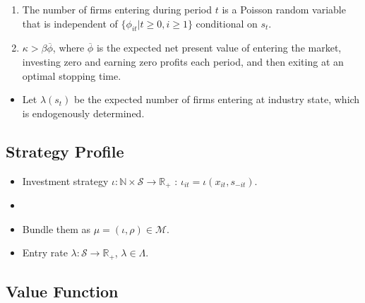 \documentclass[
]{book}
\providecommand{\tightlist}{%
  \setlength{\itemsep}{0pt}\setlength{\parskip}{0pt}}
\begin{document}
\begin{enumerate}
\def\labelenumi{\arabic{enumi}.}
\tightlist
\item
  The number of firms entering during period \(t\) is a Poisson random
  variable that is independent of \(\{\phi_{it}| t \ge 0, i \ge 1\}\)
  conditional on \(s_t\).
\item
  \(\kappa > \beta \overline{\phi}\), where \(\overline{\phi}\) is the
  expected net present value of entering the market, investing zero
  and earning zero profits each period, and then exiting at an optimal
  stopping time.
\end{enumerate}

\begin{itemize}
\tightlist
\item
  Let \(\lambda(s_t)\) be the expected number of firms entering at
  industry state, which is endogenously determined.
\end{itemize}

\hypertarget{strategy-profile}{%
\subsection{Strategy Profile}\label{strategy-profile}}

\begin{itemize}
\item
  Investment strategy
  \(\iota: \mathbb{N} \times \mathcal{S} \to \mathbb{R}_+\) :
  \(\iota_{it} = \iota(x_{it}, s_{-it})\).
\item
\item
  Bundle them as \(\mu = (\iota, \rho) \in \mathcal{M}\).
\item
  Entry rate \(\lambda: \mathcal{S} \to \mathbb{R}_+\),
  \(\lambda \in \Lambda\).
\end{itemize}

\hypertarget{value-function}{%
\subsection{Value Function}\label{value-function}}
\end{document}
